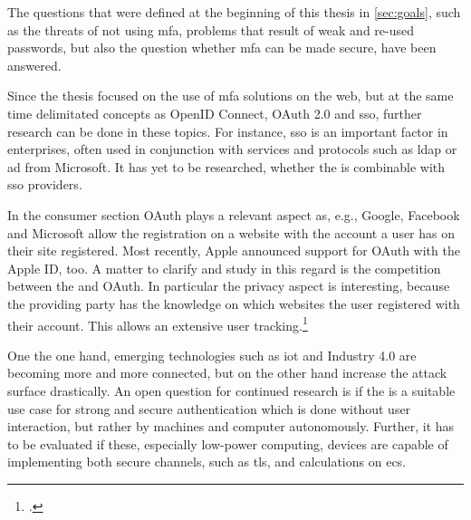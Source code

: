 The questions that were defined at the beginning of this thesis in \autoref{sec:goals}, such as the threats of not using \gls{mfa}, problems that result of weak and re-used passwords, but also the question whether \gls{mfa} can be made secure, have been answered.

Since the thesis focused on the use of \gls{mfa} solutions on the web, but at the same time delimitated concepts as OpenID Connect, OAuth 2.0 and \gls{sso}, further research can be done in these topics. For instance, \gls{sso} is an important factor in enterprises, often used in conjunction with services and protocols such as \gls{ldap} or \gls{ad} from Microsoft. It has yet to be researched, whether the \wa{} is combinable with \gls{sso} providers.

In the consumer section OAuth plays a relevant aspect as, e.g., Google, Facebook and Microsoft allow the registration on a website with the account a user has on their site registered. Most recently, Apple announced support for OAuth with the Apple ID, too. A matter to clarify and study in this regard is the competition between the \wa{} and OAuth. In particular the privacy aspect is interesting, because the providing party has the knowledge on which websites the user registered with their account. This allows an extensive user tracking.\footcites[See][18]{fido-ct-2}[See][4]{osti_1257179}

One the one hand, emerging technologies such as \gls{iot} and Industry 4.0 are becoming more and more connected, but on the other hand increase the attack surface drastically. An open question for continued research is if the \wa{} is a suitable use case for strong and secure authentication which is done without user interaction, but rather by machines and computer autonomously. Further, it has to be evaluated if these, especially low-power computing, devices are capable of implementing both secure channels, such as \gls{tls}, and calculations on \glspl{ec}.

\newpage

